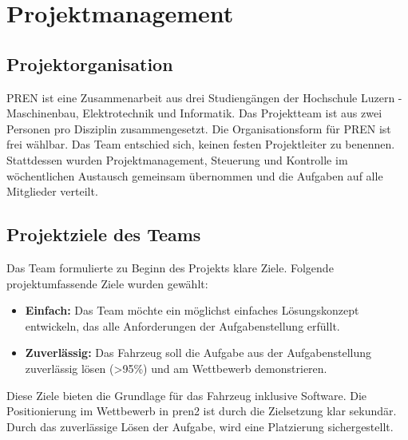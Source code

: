\documentclass[../main.tex]{subfiles}
\begin{document}
\newpage
\section{Projektmanagement}

\subsection {Projektorganisation}
PREN ist eine Zusammenarbeit aus drei Studiengängen der Hochschule Luzern - Maschinenbau, Elektrotechnik und Informatik. Das Projektteam ist aus zwei Personen pro Disziplin zusammengesetzt. Die Organisationsform für PREN ist frei wählbar. Das Team entschied sich, keinen festen Projektleiter zu benennen. Stattdessen wurden Projektmanagement, Steuerung und Kontrolle im wöchentlichen Austausch gemeinsam übernommen und die Aufgaben auf alle Mitglieder verteilt.

\subsection{Projektziele des Teams}
Das Team formulierte zu Beginn des Projekts klare Ziele. Folgende projektumfassende Ziele wurden gewählt:
\begin{itemize}
\item \textbf{Einfach:} Das Team möchte ein möglichst einfaches Lösungskonzept entwickeln, das alle Anforderungen der Aufgabenstellung erfüllt.
\item \textbf{Zuverlässig:} Das Fahrzeug soll die Aufgabe aus der Aufgabenstellung zuverlässig lösen (>95\%) und am Wettbewerb demonstrieren.
\end{itemize}

Diese Ziele bieten die Grundlage für das Fahrzeug inklusive Software.
Die Positionierung im Wettbewerb in \acrshort{pren2} ist durch die Zielsetzung klar sekundär. Durch das zuverlässige Lösen der Aufgabe, wird eine Platzierung sichergestellt.
\end{document}
